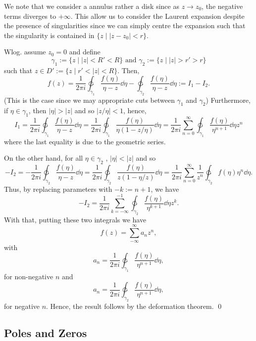 \documentclass[
]{article}
\theoremstyle{definition}
\theoremstyle{definition}
\begin{document}
We note that we consider a annulus rather a disk since as \(z \to z_0\),
the negative terms diverges to \(+\infty\). This allow us to consider
the Laurent expansion despite the presence of singularities since we can
simply centre the expansion such that the singularity is contained in
\(\{z \mid |z - z_0| < r\}\).

\proof

Wlog. assume \(z_0 = 0\) and define
\[\gamma_1 := \{z \mid |z| < R' < R\} \text{ and } 
    \gamma_2 := \{z \mid |z| > r' > r\}\] such that
\(z \in D' := \{ z \mid r' < |z| < R\}\). Then,
\[f(z) = \frac{1}{2\pi i} \ointctrclockwise_{\gamma_1} \frac{f(\eta)}{\eta - z} \dd \eta
    - \ointctrclockwise_{\gamma_2} \frac{f(\eta)}{\eta - z} \dd \eta := I_1 - I_2.\]
(This is the case since we may appropriate cuts between \(\gamma_1\) and
\(\gamma_2\)) Furthermore, if \(\eta \in \gamma_1\), then
\(|\eta| > |z|\) and so \(|z / \eta| < 1\), hence,
\[I_1 = \frac{1}{2\pi i}\ointctrclockwise_{\gamma_1} \frac{f(\eta)}{\eta - z} \dd \eta = 
    \frac{1}{2\pi i}\ointctrclockwise_{\gamma_1} \frac{f(\eta)}{\eta(1 - z / \eta)} \dd \eta 
    = \frac{1}{2\pi i}\sum_{n = 0}^\infty \ointctrclockwise_{\gamma_1} 
    \frac{f(\eta)}{\eta^{n + 1}} \dd \eta z^n \] where the last equality
is due to the geometric series.

On the other hand, for all \(\eta \in \gamma_2\) , \(|\eta| < |z|\) and
so
\[- I_2 = -\frac{1}{2\pi i}\ointctrclockwise_{\gamma_2} \frac{f(\eta)}{\eta - z} \dd \eta 
    = \frac{1}{2\pi i}\ointctrclockwise_{\gamma_2} \frac{f(\eta)}{z(1 - \eta / z)} \dd \eta
    = \frac{1}{2\pi i} \sum_{n = 0}^\infty \frac{1}{z^{n}} 
      \ointctrclockwise_{\gamma_2} f(\eta)  \eta^n \dd \eta.\] Thus, by
replacing parameters with \(- k := n + 1\), we have
\[- I_2 = \frac{1}{2\pi i} \sum_{k = - \infty}^{-1} 
    \ointctrclockwise_{\gamma_2} \frac{f(\eta)}{\eta^{k + 1}} \dd \eta z^k.\]
With that, putting these two integrals we have
\[f(z) = \sum_{-\infty}^\infty a_n z^n,\] with
\[a_n = \frac{1}{2\pi i} \ointctrclockwise_{\gamma_1} \frac{f(\eta)}{\eta^{n + 1}} \dd \eta,\]
for non-negative \(n\) and
\[a_n = \frac{1}{2\pi i} \ointctrclockwise_{\gamma_2} \frac{f(\eta)}{\eta^{n + 1}} \dd \eta,\]
for negative \(n\). Hence, the result follows by the deformation
theorem. \qed

\hypertarget{poles-and-zeros}{%
\subsection{Poles and Zeros}\label{poles-and-zeros}}
\end{document}
